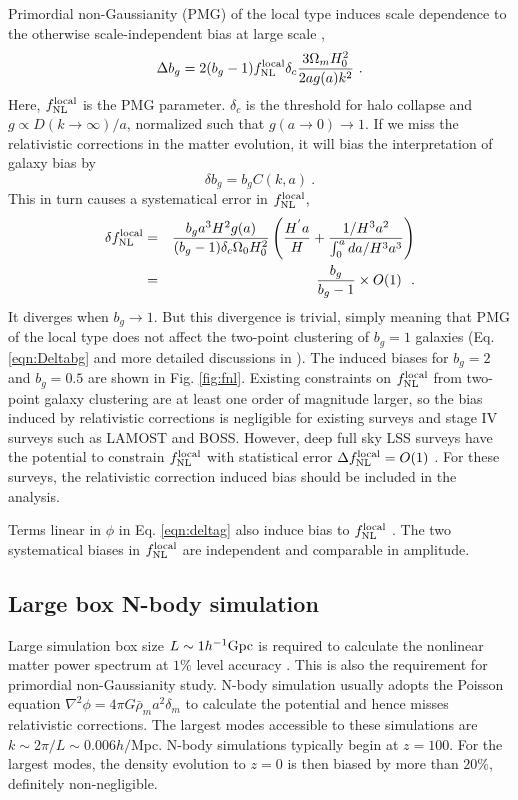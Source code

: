 \documentclass[aps,prl,showpacs,nobibnotes,twocolumn,
nobalancelastpage,superscriptaddress]{revtex4}
\newcommand{\be}{\begin{equation}}
\newcommand{\ee}{\end{equation}}
\newcommand{\ba}{\begin{eqnarray}}
\newcommand{\ea}{\end{eqnarray}}
\newcommand{\gpch}{h^{-1} {\rm Gpc}}
\begin{document}
Primordial non-Gaussianity (PMG) of the local type  induces 
scale dependence to the otherwise scale-independent bias at large scale
\cite{Dalal08}, 
\be
\label{eqn:Deltabg}
\Delta b_g=2(b_g-1)f^{\rm local}_{\rm NL}
\delta_c\frac{3\Omega_mH_0^2}{2ag(a)k^2}\ .
\ee
Here, $f^{\rm local}_{\rm NL}$ is the PMG parameter. $\delta_c$ is the threshold for halo collapse and $g\propto
D(k\rightarrow \infty)/a$, normalized such that $g(a\rightarrow 0)\rightarrow
1$. If we miss the relativistic 
corrections in the matter evolution,  it will bias the interpretation of
galaxy bias by 
\be
\delta b_g=b_gC(k,a)\ .
\ee
This in turn causes a systematical error in $f^{\rm local}_{\rm NL}$,
\ba
\delta f^{\rm local}_{\rm NL}&=&\frac{b_ga^3H^2g(a)}{(b_g-1)\delta_c\Omega_0H_0^2}\left(\frac{H^{'}a}{H}+\frac{1/H^3a^2}{\int_0^a
    da/H^3a^3} \right)\nonumber \\
&=& \frac{b_g}{b_g-1}\times O(1) \ \ .
\ea
It diverges when $b_g\rightarrow 1$. But this divergence is
trivial, simply meaning  that 
PMG of the local type does not affect the two-point clustering of  $b_g=1$ galaxies
(Eq. \ref{eqn:Deltabg} and more detailed discussions in \cite{Dalal08}). The induced biases for $b_g=2$ and $b_g=0.5$ are shown in Fig. \ref{fig:fnl}. 
Existing constraints on $f^{\rm local}_{\rm NL}$ from two-point galaxy clustering \cite{Slosar08} are
at least one order of magnitude larger, so the bias induced by relativistic
corrections is negligible for existing surveys and stage IV surveys such as LAMOST
\cite{Gong09} and BOSS.   However, deep full sky LSS surveys have the potential to
constrain  $f^{\rm local}_{\rm NL}$ with statistical error $\Delta f^{\rm
  local}_{\rm NL}=O(1)$
\cite{Seljak09}. For these surveys, 
the relativistic correction induced bias should  be included in the analysis. 

Terms linear in $\phi$ in Eq. \ref{eqn:deltag} also induce bias to $f^{\rm local}_{\rm NL}$ \cite{Yoo09,Yoo10}.
The two systematical biases in $f^{\rm local}_{\rm NL}$ are independent and comparable in
amplitude. 




\subsection{Large box N-body simulation}
Large simulation box size $L\sim 1\gpch$ is required to calculate the
nonlinear matter power spectrum at $1\%$ level accuracy
\cite{Heitmann10}. This is also the requirement for primordial
non-Gaussianity study.  N-body simulation usually adopts the Poisson equation
$\nabla^2 \phi=4\pi G\bar{\rho}_ma^2\delta_m$ to calculate the potential and
hence misses relativistic corrections. The
largest modes accessible to these simulations are $k\sim 2\pi/L\sim
0.006h/$Mpc.  N-body simulations typically begin at $z=100$. For the largest
modes, the density evolution  to $z=0$ is then biased by more than $20\%$,
definitely non-negligible. 
\end{document}
